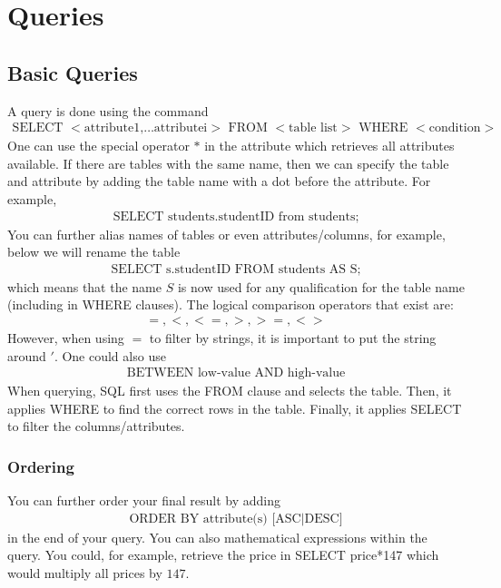 \documentclass[a4paper]{article}
\theoremstyle{plain}
\theoremstyle{definition}
\theoremstyle{remark}
\begin{document}
\section{Queries}
\subsection{Basic Queries}
A query is done using the command
\begin{align*}
	\text{SELECT }<\text{attribute1,}\ldots\text{attributei}> \text{ FROM } <\text{table list}> \text{ WHERE }<\text{condition}>
\end{align*}
One can use the special operator $*$ in the attribute which retrieves all attributes available. If there are tables with the same name, then we can specify the table and attribute by adding the table name with a dot before the attribute. For example,
\begin{align*}
	\text{SELECT students.studentID from students;}
\end{align*}
You can further alias names of tables or even attributes/columns, for example, below we will rename the table
\begin{align*}
	\text{SELECT s.studentID FROM students AS S;}
\end{align*}
which means that the name $S$ is now used for any qualification for the table name (including in WHERE clauses). The logical comparison operators that exist are:
\begin{align*}
	=,<,<=,>,>=, <>
\end{align*}
However, when using $=$ to filter by strings, it is important to put the string around $'$. One could also use
\begin{align*}
	\text{BETWEEN low-value AND high-value}
\end{align*}
When querying, SQL first uses the FROM clause and selects the table. Then, it applies WHERE to find the correct rows in the table. Finally, it applies SELECT to filter the columns/attributes. 
\subsubsection{Ordering}
You can further order your final result by adding
\begin{align*}
	\text{ORDER BY attribute(s) [ASC|DESC]}
\end{align*}
in the end of your query. You can also mathematical expressions within the query. You could, for example, retrieve the price in SELECT price*147 which would multiply all prices by $147$. 
\end{document}
